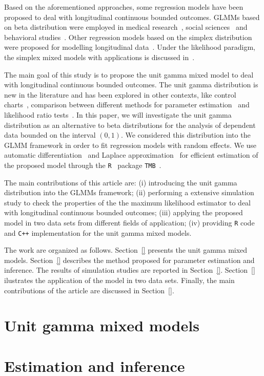 \documentclass[a4paper,12pt]{article}
\begin{document}
Based on the aforementioned approaches, some regression models have been
proposed to deal with longitudinal continuous bounded outcomes. GLMMs
based on beta distribution were employed in medical research~\citep{},
social sciences~\citep{} and behavioral studies~\citep{}. Other
regression models based on the simplex distribution were proposed for
modelling longitudinal data~\citep{}. Under the likelihood paradigm, the
simplex mixed models with applications is discussed in~\cite{}.

The main goal of this study is to propose the unit gamma mixed model to
deal with longitudinal continuous bounded outcomes. The unit gamma
distribution is new in the literature and has been explored in other
contexts, like control charts~\citep{}, comparison between different
methods for parameter estimation~\citep{} and likelihood ratio
tests~\citep{}. In this paper, we will investigate the unit gamma
distribution as an alternative to beta distributions for the analysis of
dependent data bounded on the interval \((0, 1)\). We considered this
distribution into the GLMM framework in order to fit regression models
with random effects. We use automatic differentiation~\citep{} and
Laplace approximation~\citep{tierney} for efficient estimation of the
proposed model through the \texttt{R}~\citep{R21} package
\texttt{TMB}~\citep{TMb}.

The main contributions of this article are: (i) introducing the unit
gamma distribution into the GLMMs framework; (ii) performing a extensive
simulation study to check the properties of the the maximum likelihood
estimator to deal with longitudinal continuous bounded outcomes; (iii)
applying the proposed model in two data sets from different fields of
application; (iv) providing \texttt{R} code and \texttt{C++}
implementation for the unit gamma mixed models.

The work are organized as follows. Section~\ref{} presents the unit
gamma mixed models. Section~\ref{} describes the method proposed for
parameter estimation and inference. The results of simulation studies
are reported in Section~\ref{}. Section~\ref{} ilustrates the
application of the model in two data sets. Finally, the main
contributions of the article are discussed in Section~\ref{}.

\section{Unit gamma mixed models}
\label{mixedmodel}

\section{Estimation and inference}
\label{inference}
\end{document}
